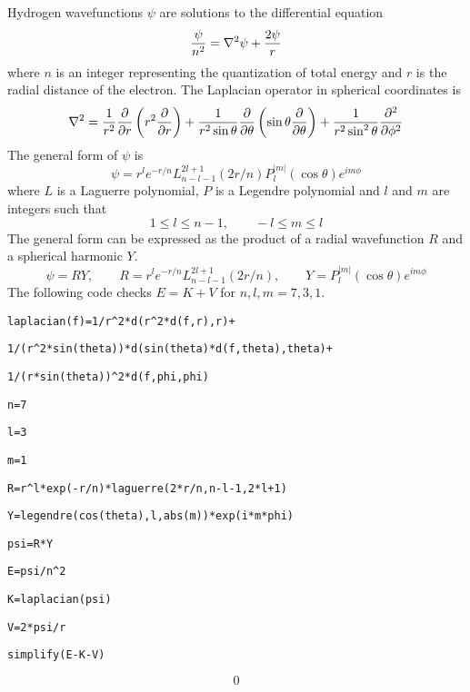 
\newpage


\noindent
Hydrogen wavefunctions $\psi$ are solutions to the differential equation
$${\psi\over n^2}=\nabla^2\psi+{2\psi\over r}$$
where $n$ is an integer representing the quantization of total energy and
$r$ is the radial distance of the electron.
The Laplacian operator in spherical coordinates is
$$\nabla^2={1\over r^2}{\partial\over\partial r}
\left(r^2{\partial\over\partial r}\right)
+{1\over r^2\sin\theta}{\partial\over\partial\theta}
\left(\sin\theta{\partial\over\partial\theta}\right)
+{1\over r^2\sin^2\theta}{\partial^2\over\partial\phi^2}$$
The general form of $\psi$ is
$$\psi=r^le^{-r/n}L_{n-l-1}^{2l+1}(2r/n)
P_l^{|m|}(\cos\theta)e^{im\phi}$$
where $L$ is a Laguerre polynomial, $P$ is a Legendre polynomial and
$l$ and $m$ are integers such that
$$1\le l\le n-1,\qquad -l\le m\le l$$
The general form can be expressed as the product of a radial
wavefunction $R$ and a spherical harmonic $Y$.
$$\psi=RY,\qquad R=r^le^{-r/n}L_{n-l-1}^{2l+1}(2r/n),\qquad
Y=P_l^{|m|}(\cos\theta)e^{im\phi}$$
The following code checks $E=K+V$ for $n,l,m=7,3,1$.

\medskip
\verb$laplacian(f)=1/r^2*d(r^2*d(f,r),r)+$

\verb$1/(r^2*sin(theta))*d(sin(theta)*d(f,theta),theta)+$

\verb$1/(r*sin(theta))^2*d(f,phi,phi)$

\verb$n=7$

\verb$l=3$

\verb$m=1$

\verb$R=r^l*exp(-r/n)*laguerre(2*r/n,n-l-1,2*l+1)$

\verb$Y=legendre(cos(theta),l,abs(m))*exp(i*m*phi)$

\verb$psi=R*Y$

\verb$E=psi/n^2$

\verb$K=laplacian(psi)$

\verb$V=2*psi/r$

\verb$simplify(E-K-V)$

$$0$$

